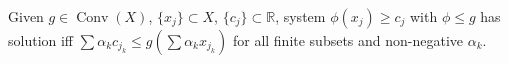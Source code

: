 Given $g\in\operatorname{Conv}(X)$, $\{x_j\}\subset X$, $\{c_j\}\subset\mathbb{R}$, system $\phi(x_j)\geqslant c_j$ with $\phi\leqslant g$ has solution iff $\sum\alpha_k c_{j_k}\leqslant g(\sum\alpha_k x_{j_k})$ for all finite subsets and non-negative $\alpha_k$.
